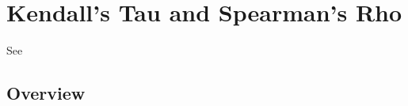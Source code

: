 %
%
%
%
%
%
%
%



\newpage
\section{Kendall's Tau and Spearman's Rho}
\label{KendallTau}

See \cite{Balakrishnan_2009}

\subsection{Overview}
\label{KendallTauOverview}

